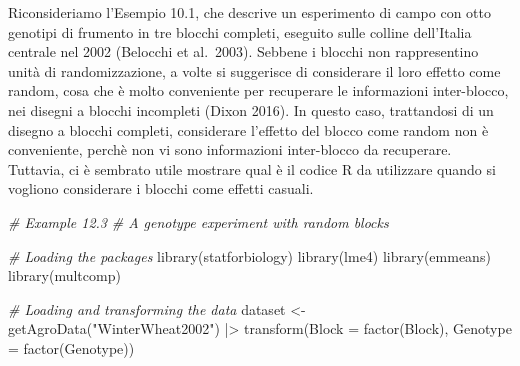 \documentclass[
  12pt,
]{book}
\newenvironment{Shaded}{\begin{snugshade}}{\end{snugshade}}
\newcommand{\AttributeTok}[1]{\textcolor[rgb]{0.77,0.63,0.00}{#1}}
\newcommand{\CommentTok}[1]{\textcolor[rgb]{0.56,0.35,0.01}{\textit{#1}}}
\newcommand{\FunctionTok}[1]{\textcolor[rgb]{0.00,0.00,0.00}{#1}}
\newcommand{\NormalTok}[1]{#1}
\newcommand{\OtherTok}[1]{\textcolor[rgb]{0.56,0.35,0.01}{#1}}
\newcommand{\SpecialCharTok}[1]{\textcolor[rgb]{0.00,0.00,0.00}{#1}}
\newcommand{\StringTok}[1]{\textcolor[rgb]{0.31,0.60,0.02}{#1}}
\begin{document}
Riconsideriamo l'Esempio 10.1, che descrive un esperimento di campo con otto genotipi di frumento in tre blocchi completi, eseguito sulle colline dell'Italia centrale nel 2002 (Belocchi et al.~2003). Sebbene i blocchi non rappresentino unità di randomizzazione, a volte si suggerisce di considerare il loro effetto come random, cosa che è molto conveniente per recuperare le informazioni inter-blocco, nei disegni a blocchi incompleti (Dixon 2016). In questo caso, trattandosi di un disegno a blocchi completi, considerare l'effetto del blocco come random non è conveniente, perchè non vi sono informazioni inter-blocco da recuperare. Tuttavia, ci è sembrato utile mostrare qual è il codice R da utilizzare quando si vogliono considerare i blocchi come effetti casuali.

\begin{Shaded}
\begin{Highlighting}[]
\CommentTok{\# Example 12.3}
\CommentTok{\# A genotype experiment with random blocks}

\CommentTok{\# Loading the packages}
\FunctionTok{library}\NormalTok{(statforbiology)}
\FunctionTok{library}\NormalTok{(lme4)}
\FunctionTok{library}\NormalTok{(emmeans)}
\FunctionTok{library}\NormalTok{(multcomp)}

\CommentTok{\# Loading and transforming the data}
\NormalTok{dataset }\OtherTok{\textless{}{-}} \FunctionTok{getAgroData}\NormalTok{(}\StringTok{"WinterWheat2002"}\NormalTok{) }\SpecialCharTok{|\textgreater{}}
  \FunctionTok{transform}\NormalTok{(}\AttributeTok{Block =} \FunctionTok{factor}\NormalTok{(Block),}
            \AttributeTok{Genotype =} \FunctionTok{factor}\NormalTok{(Genotype))}


\end{Highlighting}
\end{Shaded}
\end{document}
